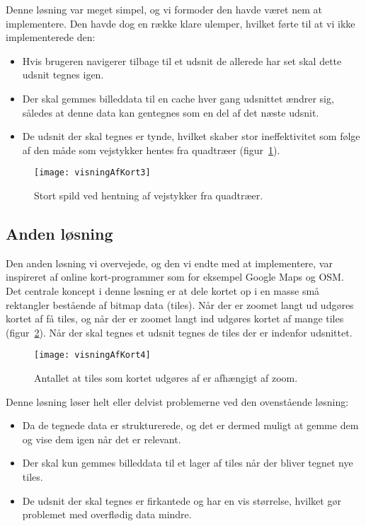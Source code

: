 Denne løsning var meget simpel, og vi formoder den havde været nem at implementere. Den havde dog en række klare ulemper, hvilket førte til at vi ikke implementerede den:

\begin{itemize}
	\item Hvis brugeren navigerer tilbage til et udsnit de allerede har set skal dette udsnit tegnes igen.
	\item Der skal gemmes billeddata til en cache hver gang udsnittet ændrer sig, således at denne data kan gentegnes som en del af det næste udsnit.
	\item De udsnit der skal tegnes er tynde, hvilket skaber stor ineffektivitet som følge af den måde som vejstykker hentes fra quadtræer (figur~\ref{figur:visningAfKort3}).
\end{itemize}

\begin{figure}[h]
	\centering
	\texttt{[image: visningAfKort3]}
	\captionsetup{width=0.8\textwidth}
	\caption{Stort spild ved hentning af vejstykker fra quadtræer.}
	\label{figur:visningAfKort3}
\end{figure}

\subsection{Anden løsning}
\label{subsec:andenLoesning}

Den anden løsning vi overvejede, og den vi endte med at implementere, var inspireret af online kort-programmer som for eksempel Google Maps og OSM. Det centrale koncept i denne løsning er at dele kortet op i en masse små rektangler bestående af bitmap data (tiles). Når der er zoomet langt ud udgøres kortet af få tiles, og når der er zoomet langt ind udgøres kortet af mange tiles (figur~\ref{figur:visningAfKort4}). Når der skal tegnes et udsnit tegnes de tiles der er indenfor udsnittet.

\begin{figure}[h]
	\centering
	\texttt{[image: visningAfKort4]}
	\captionsetup{width=0.8\textwidth}
	\caption{Antallet at tiles som kortet udgøres af er afhængigt af zoom.}
	\label{figur:visningAfKort4}
\end{figure}

Denne løsning løser helt eller delvist problemerne ved den ovenstående løsning:

\begin{itemize}
	\item Da de tegnede data er strukturerede, og det er dermed muligt at gemme dem og vise dem igen når det er relevant.
	\item Der skal kun gemmes billeddata til et lager af tiles når der bliver tegnet nye tiles.
	\item De udsnit der skal tegnes er firkantede og har en vis størrelse, hvilket gør problemet med overflødig data mindre.
\end{itemize}

